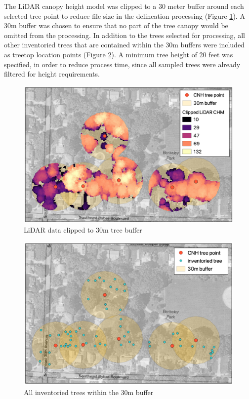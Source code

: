 \documentclass[12pt,twoside]{reedthesis}
\begin{document}
The LiDAR canopy height model was clipped to a 30 meter buffer around each selected tree point to reduce file size in the delineation processing (Figure \ref{fig:lidar-buffer}). A 30m buffer was chosen to ensure that no part of the tree canopy would be omitted from the processing. In addition to the trees selected for processing, all other inventoried trees that are contained within the 30m buffers were included as treetop location points (Figure \ref{fig:buffer-points}). A minimum tree height of 20 feet was specified, in order to reduce process time, since all sampled trees were already filtered for height requirements.
\begin{figure}

{\centering \includegraphics[width=1\linewidth]{figure/lidar_buffer_scale} 

}

\caption{LiDAR data clipped to 30m tree buffer}\label{fig:lidar-buffer}
\end{figure}
\begin{figure}

{\centering \includegraphics[width=1\linewidth]{figure/buffer_all_points} 

}

\caption{All inventoried trees within the 30m buffer}\label{fig:buffer-points}
\end{figure}
\end{document}
